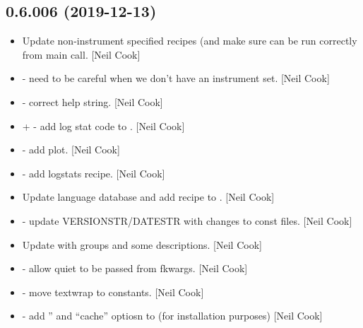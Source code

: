 \documentclass[a4paper,10pt,english]{report}
\begin{document}
\subsection{0.6.006 (2019-12-13)}
\label{\detokenize{misc/changelog:id13}}\begin{itemize}
\item {} 
Update non-instrument specified recipes (and make sure
 can be run correctly from main call. {[}Neil Cook{]}

\item {} 
 - need to be careful when we don’t have an instrument
set. {[}Neil Cook{]}

\item {} 
 - correct help string. {[}Neil Cook{]}

\item {} 
 +  - add
log stat code to . {[}Neil Cook{]}

\item {} 
 - add  plot. {[}Neil Cook{]}

\item {} 
 - add logstats recipe.
{[}Neil Cook{]}

\item {} 
Update language database and add recipe to . {[}Neil Cook{]}

\item {} 
 - update
VERSIONSTR/DATESTR with changes to const files. {[}Neil Cook{]}

\item {} 
Update  with groups and some
descriptions. {[}Neil Cook{]}

\item {} 
 - allow quiet to be passed from fkwargs.
{[}Neil Cook{]}

\item {} 
 - move textwrap to constants. {[}Neil Cook{]}

\item {} 
 - add ” and “cache”
optiosn to  (for installation purposes) {[}Neil Cook{]}


\end{itemize}
\end{document}

